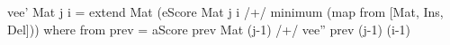 vee' Mat j i = extend Mat
              (eScore Mat j i /+/ minimum (map from [Mat, Ins, Del]))
 where from prev = aScore prev Mat (j-1) /+/ vee'' prev (j-1) (i-1)
